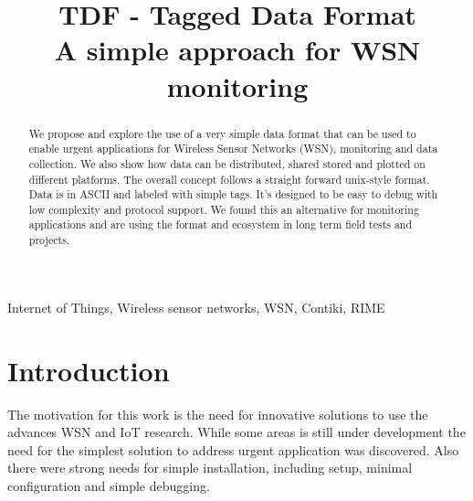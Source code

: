 \documentclass[conference, a4paper,10pt,twocolumn]{IEEEtran}
\begin{document}
\title{TDF - Tagged Data Format \\ A simple approach for WSN monitoring}



\maketitle
\begin{abstract}

We propose and explore the use of a very simple data format that can be used to enable 
urgent applications for Wireless Sensor Networks (WSN), monitoring and data collection. 
We also show how data can be distributed, shared stored and plotted on different platforms.
The overall concept follows a straight forward unix-style format. Data is in ASCII
and labeled with simple tags. 
It's designed to be easy to debug with low complexity and protocol support. We found 
this an alternative for monitoring applications and are using the format and ecosystem 
in long term field tests and projects.


\end{abstract}

\begin{IEEEkeywords} 
Internet of Things, Wireless sensor networks, WSN, Contiki, RIME
 \end{IEEEkeywords}



%

\section{Introduction}
\label{sec:intro}
 

The motivation for this work is the need for innovative solutions to use the advances 
WSN and IoT research. While some areas is still under development the need for the
simplest solution to address urgent application was discovered. Also there were 
strong needs for simple installation, including setup, minimal configuration and 
simple debugging.
\end{document}
